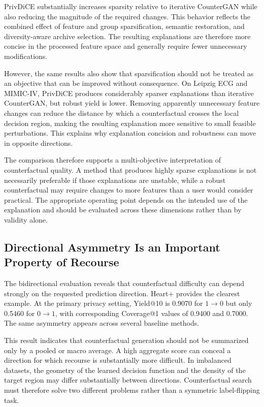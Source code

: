 \documentclass[preprint,12pt]{elsarticle}
\begin{document}
PrivDiCE substantially increases sparsity relative to iterative CounterGAN while
also reducing the magnitude of the required changes. This behavior reflects the
combined effect of feature and group sparsification, semantic restoration, and
diversity-aware archive selection. The resulting explanations are therefore
more concise in the processed feature space and generally require fewer
unnecessary modifications.

However, the same results also show that sparsification should not be treated
as an objective that can be improved without consequence. On Leipzig ECG and
MIMIC-IV, PrivDiCE produces considerably sparser explanations than iterative
CounterGAN, but robust yield is lower. Removing apparently unnecessary feature
changes can reduce the distance by which a counterfactual crosses the local
decision region, making the resulting explanation more sensitive to small
feasible perturbations. This explains why explanation concision and robustness
can move in opposite directions.

The comparison therefore supports a multi-objective interpretation of
counterfactual quality. A method that produces highly sparse explanations is
not necessarily preferable if those explanations are unstable, while a robust
counterfactual may require changes to more features than a user would consider
practical. The appropriate operating point depends on the intended use of the
explanation and should be evaluated across these dimensions rather than by
validity alone.


\subsection{Directional Asymmetry Is an Important Property of Recourse}
\label{subsec:discussion_directionality}

The bidirectional evaluation reveals that counterfactual difficulty can depend
strongly on the requested prediction direction. Heart+ provides the clearest
example. At the primary privacy setting, Yield@10 is 0.9070 for
$1\rightarrow0$ but only 0.5460 for $0\rightarrow1$, with corresponding
Coverage@1 values of 0.9400 and 0.7000. The same asymmetry appears across
several baseline methods.

This result indicates that counterfactual generation should not be summarized
only by a pooled or macro average. A high aggregate score can conceal a
direction for which recourse is substantially more difficult. In imbalanced
datasets, the geometry of the learned decision function and the density of the
target region may differ substantially between directions. Counterfactual
search must therefore solve two different problems rather than a symmetric
label-flipping task.
\end{document}
